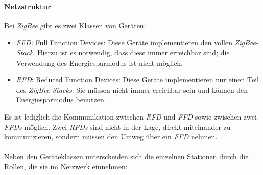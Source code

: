             \paragraph{Netzstruktur}
                Bei \emph{ZigBee} gibt es zwei Klassen von Geräten:

                \begin{itemize}
                    \item{\emph{FFD:}} Full Function Devices: Diese Geräte implementieren
                                den vollen \emph{ZigBee-Stack}. Hierzu ist es notwendig,
                                dass diese immer erreichbar sind; die Verwendung
                                des Energiesparmodus ist nicht möglich.
                    \item{\emph{RFD}:} Reduced Function Devices: Diese Geräte implementieren
                                nur einen Teil des \emph{ZigBee-Stacks}. Sie müssen nicht
                                immer ereichbar sein und können den Energiesparmodus
                                benutzen. 
                \end{itemize}

                Es ist lediglich die Kommunikation zwischen \emph{RFD} und \emph{FFD} sowie zwischen
                zwei \emph{FFDs} möglich. Zwei \emph{RFDs} sind nicht in der Lage, direkt miteinander
                zu kommunizieren, sondern müssen den Umweg über ein \emph{FFD} nehmen.\\
                \\
                Neben den Geräteklassen unterscheiden sich die einzelnen Stationen durch
                die Rollen, die sie im Netzwerk einnehmen:


